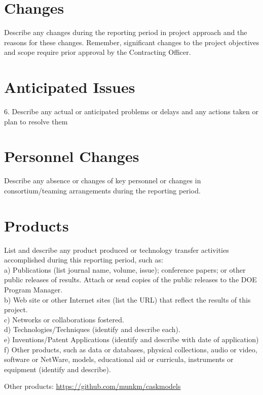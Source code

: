 \documentclass[12pt]{article}
\begin{document}
\section{Changes}
\label{sect::changes}
Describe any changes during the reporting period in project approach and the reasons for these changes.  Remember, significant changes to the project objectives and scope require prior approval by the Contracting Officer. 

\section{Anticipated Issues}
\label{sect::schedule}
6.	Describe any actual or anticipated problems or delays and any actions taken or plan to resolve them 

\section{Personnel Changes}
\label{sect::personnel}
Describe any absence or changes of key personnel or changes in consortium/teaming arrangements during the reporting period. 

\section{Products}
\label{sect::products}
List and describe any product produced or technology transfer activities accomplished during this reporting period, such as: \\
a)	Publications (list journal name, volume, issue); conference papers; or other public releases of results.  Attach or send copies of the public releases to the DOE Program Manager. \\
b)	Web site or other Internet sites (list the URL) that reflect the results of this project. \\
c)	Networks or collaborations fostered. \\
d)	Technologies/Techniques (identify and describe each). \\
e)	Inventions/Patent Applications (identify and describe with date of application) \\
f)	Other products, such as data or databases, physical collections, audio or video, software or NetWare, models, educational aid or curricula, instruments or equipment (identify and describe).

Other products: \href{https://github.com/munkm/caskmodels}{https://github.com/munkm/caskmodels}
\end{document}
